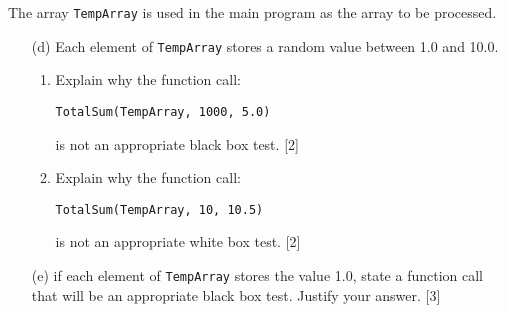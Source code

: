 The array \texttt{TempArray} is used in the main program as the array
to be processed.\quad{} 
\begin{enumerate}
\item[(d)]  Each element of \texttt{TempArray} stores a random value between
1.0 and 10.0.
\begin{enumerate}
\item Explain why the function call:

\texttt{TotalSum(TempArray, 1000, 5.0)}

is not an appropriate black box test. \hfill{}{[}2{]}
\item Explain why the function call:

\texttt{TotalSum(TempArray, 10, 10.5)}

is not an appropriate white box test. \hfill{}{[}2{]}
\end{enumerate}
\item[(e)] if each element of \texttt{TempArray} stores the value 1.0, state
a function call that will be an appropriate black box test. Justify
your answer. \hfill{}{[}3{]}
\end{enumerate}